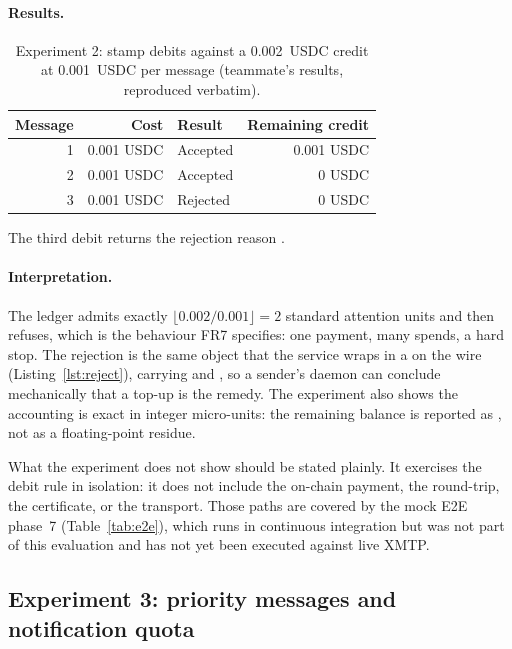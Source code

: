 \paragraph{Results.}

\begin{table}[htbp]
\centering\small
\caption{Experiment 2: stamp debits against a 0.002~USDC credit at 0.001~USDC per message
(teammate's results, reproduced verbatim).}
\label{tab:postage}
\begin{tabular}{@{}rrlr@{}}
\toprule
\textbf{Message} & \textbf{Cost} & \textbf{Result} & \textbf{Remaining credit} \\
\midrule
1 & 0.001 USDC & Accepted & 0.001 USDC \\
2 & 0.001 USDC & Accepted & 0 USDC \\
3 & 0.001 USDC & Rejected & 0 USDC \\
\bottomrule
\end{tabular}
\end{table}

The third debit returns the rejection reason .

\paragraph{Interpretation.}
The ledger admits exactly $\lfloor 0.002 / 0.001 \rfloor = 2$ standard attention units
and then refuses, which is the behaviour FR7 specifies: one payment, many spends, a hard
stop. The rejection is the same  object that the service wraps in
a  on the wire (Listing~\ref{lst:reject}), carrying  and
, so a sender's daemon can conclude mechanically that a top-up is
the remedy. The experiment also shows the accounting is exact in integer micro-units: the
remaining balance is reported as , not as a floating-point residue.

What the experiment does not show should be stated plainly. It exercises the debit rule in
isolation: it does not include the on-chain payment, the 
round-trip, the certificate, or the transport. Those paths are covered by the mock E2E
phase~7 (Table~\ref{tab:e2e}), which runs in continuous integration but was not part of
this evaluation and has not yet been executed against live XMTP.

\subsection{Experiment 3: priority messages and notification quota}
\label{sec:eval-quota}

